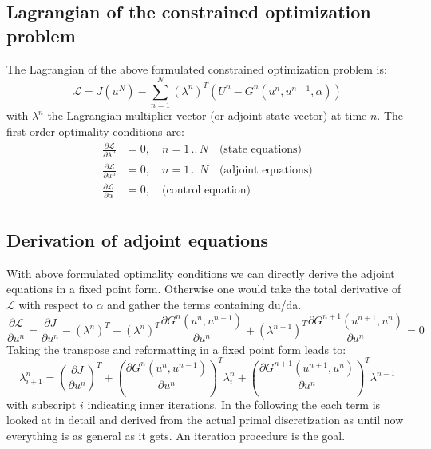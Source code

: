 \documentclass[10pt]{article}
\begin{document}
\subsection{Lagrangian of the constrained optimization problem}
The Lagrangian of the above formulated constrained optimization problem is:
\begin{equation}
\mathcal{L} = J\left( u^N \right) - \sum_{n=1}^{N} \left( \lambda^n \right)^T\left( U^n - G^n \left( u^n, u^{n-1}, \alpha \right) \right)
\end{equation}
with $\lambda^n$ the Lagrangian multiplier vector (or adjoint state vector) at time $n$. The first order optimality conditions are:
\begin{align}
\frac{\partial \mathcal{L}}{\partial \lambda^n} &= 0,\quad n= 1\,..\,N\quad\text{(state equations)}\\
\frac{\partial \mathcal{L}}{\partial u^n} &= 0,\quad n= 1\,..\,N\quad\text{(adjoint equations)}\\
\frac{\partial \mathcal{L}}{\partial \alpha} &= 0,\quad\text{(control equation)}\\
\end{align}
\subsection{Derivation of adjoint equations}
With above formulated optimality conditions we can directly derive the adjoint equations in a fixed point form. Otherwise one would take the total derivative of $\mathcal{L}$ with respect to $\alpha$ and gather the terms containing du/da.
\begin{equation}
\frac{\partial \mathcal{L}}{\partial u^n} = \frac{\partial J}{\partial u^n} - \left( \lambda^n \right)^T +\left( \lambda^n \right)^T \frac{\partial G^n \left( u^n,u^{n-1} \right)}{\partial u^n} +\left( \lambda^{n+1} \right)^T \frac{\partial G^{n+1}\left( u^{n+1},u^{n} \right)}{\partial u^n}  = 0
\end{equation}
Taking the transpose and reformatting in a fixed point form leads to:
\begin{equation}
\lambda^{n}_{i+1} = \left( \frac{\partial J}{\partial u^n} \right)^T + \left( \frac{\partial G^n\left( u^n,u^{n-1} \right)}{\partial u^n}  \right)^T \lambda^n_i  +\left( \frac{\partial G^{n+1}\left( u^{n+1},u^{n} \right)}{\partial u^n}  \right)^T \lambda^{n+1}
\end{equation}
with subscript $i$ indicating inner iterations. In the following the each term is looked at in detail and derived from the actual primal discretization as until now everything is as general as it gets. An iteration procedure is the goal. 
\end{document}
